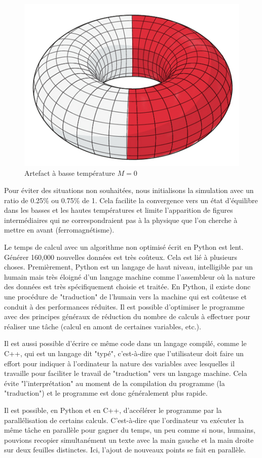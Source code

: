 \documentclass[11pt, parskip=half]{scrartcl} %
\begin{document}
\begin{figure}[h]
	\centering
	\includegraphics[width=0.3\linewidth]{./figures/donut.jpg}
	\caption{Artefact à basse température $M=0$}
	\label{fig:H}
\end{figure}

Pour éviter des situations non souhaitées, nous initialisons la simulation avec un ratio de 0.25\% ou 0.75\% de 1. Cela facilite la convergence vers un état d'équilibre dans les basses et les hautes températures et limite l'apparition de figures intermédiaires qui ne correspondraient pas à la physique que l'on cherche à mettre en avant (ferromagnétisme).

Le temps de calcul avec un algorithme non optimisé écrit en Python est lent. Générer 160,000 nouvelles données est très coûteux. Cela est lié à plusieurs choses. Premièrement, Python est un langage de haut niveau, intelligible par un humain mais très éloigné d'un langage machine comme l'assembleur où la nature des données est très spécifiquement choisie et traitée. En Python, il existe donc une procédure de "traduction" de l'humain vers la machine qui est coûteuse et conduit à des performances réduites. Il est possible d'optimiser le programme avec des principes généraux de réduction du nombre de calculs à effectuer pour réaliser une tâche (calcul en amont de certaines variables, etc.).

Il est aussi possible d'écrire ce même code dans un langage compilé, comme le C++, qui est un langage dit "typé", c'est-à-dire que l'utilisateur doit faire un effort pour indiquer à l'ordinateur la nature des variables avec lesquelles il travaille pour faciliter le travail de "traduction" vers un langage machine. Cela évite "l'interprétation" au moment de la compilation du programme (la "traduction") et le programme est donc généralement plus rapide.

Il est possible, en Python et en C++, d'accélérer le programme par la parallélisation de certains calculs. C'est-à-dire que l'ordinateur va exécuter la même tâche en parallèle pour gagner du temps, un peu comme si nous, humains, pouvions recopier simultanément un texte avec la main gauche et la main droite sur deux feuilles distinctes. Ici, l'ajout de nouveaux points se fait en parallèle.
\end{document}
